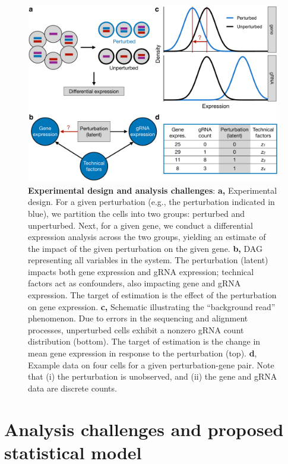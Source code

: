 \documentclass[12pt]{article}
\begin{document}
\begin{figure}[h!]
	\centering
	\includegraphics[width=1\linewidth]{figures/analysis_challenges.pdf}
	\caption{\textbf{Experimental design and analysis challenges}: \textbf{a,} Experimental design. For a given perturbation (e.g., the perturbation indicated in blue), we partition the cells into two groups: perturbed and unperturbed. Next, for a given gene, we conduct a differential expression analysis across the two groups, yielding an estimate of the impact of the given perturbation on the given gene. \textbf{b,} DAG representing all variables in the system. The perturbation (latent) impacts both gene expression and gRNA expression; technical factors act as confounders, also impacting gene and gRNA expression. The target of estimation is the effect of the perturbation on gene expression. \textbf{c,} Schematic illustrating the ``background read'' phenomenon. Due to errors in the sequencing and alignment processes, unperturbed cells exhibit a nonzero gRNA count distribution (bottom). The target of estimation is the change in mean gene expression in response to the perturbation (top). \textbf{d}, Example data on four cells for a given perturbation-gene pair. Note that (i) the perturbation is unobserved, and (ii) the gene and gRNA data are discrete counts.}
	\label{analysis_challenges}
\end{figure}

\section{Analysis challenges and proposed statistical model}
\end{document}
